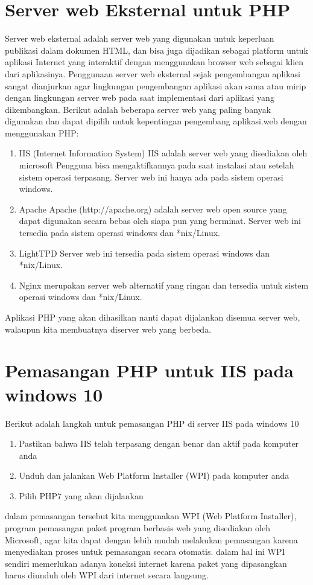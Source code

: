 \section{Server web Eksternal untuk PHP}
Server web eksternal adalah server web yang digunakan untuk keperluan publikasi dalam dokumen HTML, dan bisa juga dijadikan sebagai platform untuk aplikasi Internet yang interaktif dengan menggunakan browser web sebagai klien dari aplikasinya. Penggunaan server web eksternal sejak pengembangan aplikasi sangat dianjurkan agar lingkungan pengembangan aplikasi akan sama atau mirip dengan lingkungan server web pada saat implementasi dari aplikasi yang dikembangkan. Berikut adalah beberapa server web yang paling banyak digunakan dan dapat dipilih untuk kepentingan pengembang aplikasi.web dengan menggunakan PHP:
\begin{enumerate}
\item IIS (Internet Information System)
IIS adalah server web yang disediakan oleh microsoft Pengguna bisa mengaktifkannya pada saat instalasi atau setelah sistem operasi terpasang. Server web ini hanya ada pada sistem operasi windows.

\item Apache
Apache (http://apache.org) adalah server web open source yang dapat digunakan secara bebas oleh siapa pun yang berminat. Server web ini tersedia pada sistem operasi windows dan *nix/Linux.

\item LightTPD
Server web ini tersedia pada sistem operasi windows dan *nix/Linux.
  
\item Nginx
merupakan server web alternatif yang ringan dan tersedia untuk sistem operasi windows dan *nix/Linux.
\end {enumerate}

Aplikasi PHP yang akan dihasilkan nanti dapat dijalankan disemua server web, walaupun kita membuatnya diserver web yang berbeda.


\section{Pemasangan PHP untuk IIS pada windows 10 }
Berikut adalah langkah untuk pemasangan PHP di server IIS pada windows 10
\begin{enumerate}
\item Pastikan bahwa IIS telah terpasang dengan benar dan aktif pada komputer anda
\item Unduh dan jalankan Web Platform Installer (WPI) pada komputer anda
\item Pilih PHP7 yang akan dijalankan
\end{enumerate}

dalam pemasangan tersebut kita menggunakan WPI (Web Platform Installer), program pemasangan paket program berbasis web yang disediakan oleh Microsoft, agar kita dapat dengan lebih mudah melakukan pemasangan karena menyediakan proses untuk pemasangan secara otomatis. dalam hal ini WPI sendiri memerlukan adanya koneksi internet karena paket yang dipasangkan harus diunduh oleh WPI dari internet secara langsung. 

